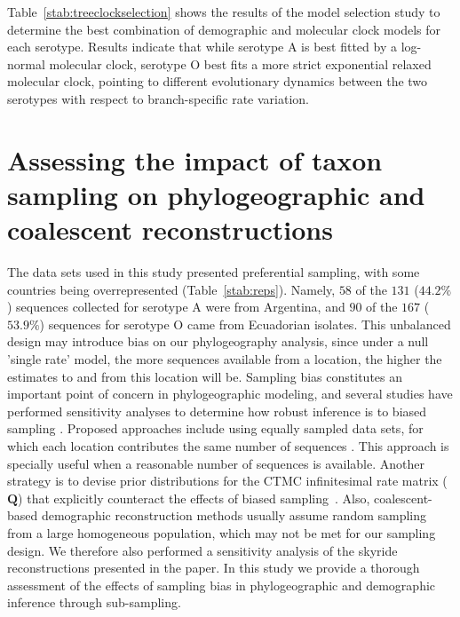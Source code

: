 \documentclass[a4paper,10pt]{article}
\begin{document}
Table~\ref{stab:treeclockselection} shows the results of the model selection study to determine the best combination of demographic and molecular clock models for each serotype.
Results indicate that while serotype A is best fitted by a log-normal molecular clock, serotype O best fits a more strict exponential relaxed molecular clock, pointing to different evolutionary dynamics between the two serotypes with respect to branch-specific rate variation. 

\section{Assessing the impact of taxon sampling on phylogeographic and coalescent reconstructions}

The data sets used in this study presented preferential sampling, with some countries being overrepresented (Table~\ref{stab:reps}).
Namely, $58$ of the $131$ ($44.2\%$) sequences collected for serotype A were from Argentina, and $90$ of the $167$ ($53.9\%$) sequences for serotype O came from Ecuadorian isolates.
This unbalanced design may introduce bias on our phylogeography analysis, since under a null 'single rate' model, the more sequences available from a location, the higher the estimates to and from this location will be.
Sampling bias constitutes an important point of concern in phylogeographic modeling, and several studies have performed sensitivity analyses to determine how robust inference is to biased sampling \cite{M-Faria2012, M-Lemey2014, M-polar, M-fluPNAS}.
Proposed approaches include using equally sampled data sets, for which each location contributes the same number of sequences \cite{M-fluPNAS}.
This approach is specially useful when a reasonable number of sequences is available.
Another strategy is to devise prior distributions for the CTMC infinitesimal rate matrix ($\mathbf{Q}$) that explicitly counteract the effects of biased sampling~\cite{M-Faria2012}.
Also, coalescent-based demographic reconstruction methods usually assume random sampling from a large homogeneous population, which may not be met for our sampling design.
We therefore also performed a sensitivity analysis of the skyride reconstructions presented in the paper.
In this study we provide a thorough assessment of the effects of sampling bias in phylogeographic and demographic inference through sub-sampling. 
\end{document}
